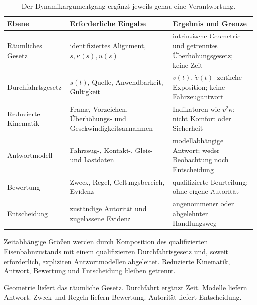 \begin{table}[htbp]
\centering
\small
\begin{tabular}{p{}p{}p{}}
\toprule
\textbf{Ebene} & \textbf{Erforderliche Eingabe} & \textbf{Ergebnis und Grenze}\\
\midrule
Räumliches Gesetz & identifiziertes Alignment, \(s,\kappa(s),u(s)\) & intrinsische Geometrie und getrenntes Überhöhungsgesetz; keine Zeit\\
Durchfahrtsgesetz & \(s(t)\), Quelle, Anwendbarkeit, Gültigkeit & \(v(t)\), \(\dot v(t)\), zeitliche Exposition; keine Fahrzeugantwort\\
Reduzierte Kinematik & Frame, Vorzeichen, Überhöhungs- und Geschwindigkeitsannahmen & Indikatoren wie \(v^2\kappa\); nicht Komfort oder Sicherheit\\
Antwortmodell & Fahrzeug-, Kontakt-, Gleis- und Lastdaten & modellabhängige Antwort; weder Beobachtung noch Entscheidung\\
Bewertung & Zweck, Regel, Geltungsbereich, Evidenz & qualifizierte Beurteilung; ohne eigene Autorität\\
Entscheidung & zuständige Autorität und zugelassene Evidenz & angenommener oder abgelehnter Handlungsweg\\
\bottomrule
\end{tabular}
\caption{Der Dynamikargumentgang ergänzt jeweils genau eine Verantwortung.}
\label{tab:dynamics-responsibility-layers}
\end{table}

\begin{principle}
\label{princ:dynamic-state-interpretation}
Zeitabhängige Größen werden durch Komposition des qualifizierten
Eisenbahnzustands mit einem qualifizierten Durchfahrtsgesetz und, soweit
erforderlich, expliziten Antwortmodellen abgeleitet. Reduzierte Kinematik,
Antwort, Bewertung und Entscheidung bleiben getrennt.
\end{principle}

\begin{summary}
Geometrie liefert das räumliche Gesetz. Durchfahrt ergänzt Zeit. Modelle
liefern Antwort. Zweck und Regeln liefern Bewertung. Autorität liefert
Entscheidung.
\end{summary}
